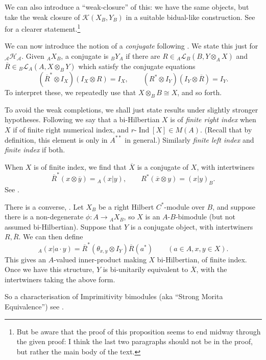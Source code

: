 \documentclass[a4paper,11pt]{article}
\theoremstyle{plain}
\theoremstyle{remark}
\newcommand{\mc}[1]{\mathcal{#1}}
\newcommand{\ind}{\operatorname{Ind}}
\begin{document}
We can also introduce a ``weak-closure'' of this: we have the same objects, but take the weak closure of $\mc K(X_B, Y_B)$ in a suitable bidual-like construction.  See \cite[Proposition~4.2]{KPW_JonesIndexTheory} for a clearer statement.\footnote{But be aware that the proof of this proposition seems to end midway through the given proof: I think the last two paragraphs should not be in the proof, but rather the main body of the text.}

We can now introduce the notion of a \emph{conjugate} following \cite{LR_Theory_dimension}.  We state this just for ${}_{\mc A}\mc H_{\mc A}$.  Given ${}_AX_B$, a conjugate is ${}_BY_A$ if there are $R\in {}_A\mc L_B(B, Y\otimes_A X)$ and $\overline R \in {}_B\mc L_A(A, X\otimes_B Y)$ which satisfy the conjugate equations
\[ (\overline R^*\otimes I_X) (I_X\otimes R) = I_X, \qquad
(R^*\otimes I_Y)(I_Y\otimes \overline R) = I_Y. \]
To interpret these, we repeatedly use that $X \otimes_B B \cong X$, and so forth.

To avoid the weak completions, we shall just state results under slightly stronger hypotheses.  Following \cite[Definition~2.23]{KPW_JonesIndexTheory} we say that a bi-Hilbertian $X$ is of \emph{finite right index} when $X$ if of finite right numerical index, and $r\text{-}\ind[X] \in M(A)$.  (Recall that by definition, this element is only in $A^{**}$ in general.)  Similarly \emph{finite left index} and \emph{finite index} if both.

When $X$ is of finite index, we find that $\overline X$ is a conjugate of $X$, with intertwiners
\[ \overline R^* (x\otimes\overline y) = {}_A(x|y), \qquad
R^*(\overline x\otimes y) = (x|y)_B. \]
See \cite[Theorem~4.4]{KPW_JonesIndexTheory}.

There is a converse, \cite[Theorem~4.13]{KPW_JonesIndexTheory}.  Let $X_B$ be a right Hilbert $C^*$-module over $B$, and suppose there is a non-degenerate $\phi \colon A \to {}_AX_B$, so $X$ is an $A$-$B$-bimodule (but not assumed bi-Hilbertian).  Suppose that $Y$ is a conjugate object, with intertwiners $R,\overline R$.  We can then define
\[ {}_A(x|a\cdot y) = \overline{R}^* (\theta_{x,y}\otimes I_Y) \overline R(a^*)
\qquad (a\in A, x,y\in X). \]
This gives an $A$-valued inner-product making $X$ bi-Hilbertian, of finite index.  Once we have this structure, $Y$ is bi-unitarily equivalent to $\overline X$, with the intertwiners taking the above form.

So a characterisation of Imprimitivity bimodules (aka ``Strong Morita Equivalence'') see \cite[Corollary~4.14]{KPW_JonesIndexTheory}.
\end{document}

